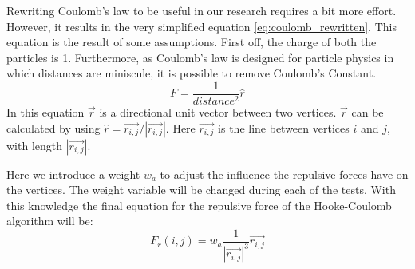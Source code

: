\documentclass[a4paper,12pt]{article}
\begin{document}
    Rewriting Coulomb's law to be useful in our research requires a bit more effort.
    However, it results in the very simplified equation \ref{eq:coulomb_rewritten}.
    This equation is the result of some assumptions.
    First off, the charge of both the particles is 1.
    Furthermore, as Coulomb's law is designed for particle physics in which distances are miniscule, it is possible to remove Coulomb's Constant.
    \begin{equation}
      F = \frac{1}{distance^2} \hat{r}
    \end{equation}
    In this equation $\vec{r}$ is a directional unit vector between two vertices.
    $\vec{r}$ can be calculated by using $\hat{r} = \vec{r_{i,j}} / |\vec{r_{i,j}}|$.
    Here $\vec{r_{i,j}}$ is the line between vertices $i$ and $j$, with length $|\vec{r_{i,j}}|$.

    Here we introduce a weight $w_a $ to adjust the influence the repulsive forces have on the vertices.
    The weight variable will be changed during each of the tests.
    With this knowledge the final equation for the repulsive force of the Hooke-Coulomb algorithm will be:
    \begin{equation}
      F_r(i,j) = w_a \frac{1}{|\vec{r_{i,j}}|^3} \vec{r_{i,j}}
    \end{equation}
\end{document}
